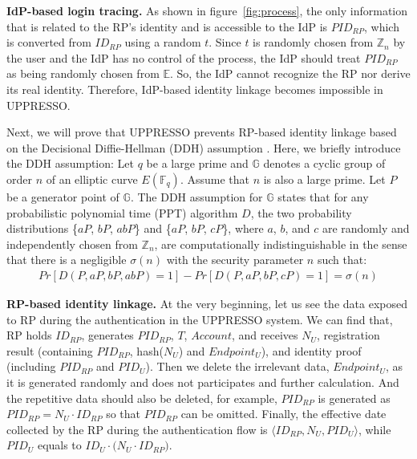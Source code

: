 \noindent\textbf{IdP-based login tracing.}
As shown in figure~\ref{fig:process}, the only information that is related to the RP's identity and is accessible to the IdP is $PID_{RP}$,
 which is converted from $ID_{RP}$ using a random $t$.
Since $t$ is randomly chosen from $\mathbb{Z}_n$ by the user
 and the IdP has no control of the process,
 the IdP should treat $PID_{RP}$ as being randomly chosen from $\mathbb{E}$.
So, the IdP cannot recognize the RP nor derive its real identity. Therefore, IdP-based identity linkage becomes impossible in UPPRESSO.

Next, we will prove that UPPRESSO prevents RP-based identity linkage based on the Decisional Diffie-Hellman (DDH) assumption \cite{GoldwasserK16}. Here, we briefly introduce the DDH assumption:
Let $q$ be a large prime and $\mathbb{G}$ denotes a cyclic group of order $n$ of an elliptic curve $E(\mathbb{F}_q)$.
Assume that $n$ is also a large prime. Let $P$ be a generator point of $\mathbb{G}$. The DDH assumption for $\mathbb{G}$ states that for any probabilistic polynomial time (PPT) algorithm $D$, the two probability distributions \{$aP$, $bP$, $abP$\} and \{$aP$, $bP$, $cP$\}, where $a$, $b$, and $c$ are randomly and independently chosen from $\mathbb{Z}_n$, are computationally indistinguishable in the sense that there is a negligible $\sigma(n)$ with the security parameter $n$ such that:
\vspace{-\topsep}
\begin{multline*}
Pr[D(P, aP, bP, abP)=1]-Pr[D(P, aP, bP, cP)=1]=\sigma(n)
\end{multline*}
\vspace{-\topsep}

\vspace{-2mm}
\noindent\textbf{RP-based identity linkage.}
At the very beginning, let us see the data exposed to RP during the authentication in the UPPRESSO system.
We can find that, RP holds $ID_{RP}$,  generates $PID_{RP}$, $T$, $Account$, and receives $N_U$, registration result (containing $PID_{RP}$, hash($N_U$) and $Endpoint_U$), and identity proof (including $PID_{RP}$ and $PID_U$). Then we delete the irrelevant data, $Endpoint_U$, as it is generated randomly and does not participates and further calculation. And the repetitive data should also be deleted, for example, $PID_{RP}$ is generated as $PID_{RP}=N_U \cdot {ID_{RP}}$ so that $PID_{RP}$ can be omitted. Finally, the effective date collected by the RP during the authentication flow is $\langle ID_{RP}, N_U, PID_U\rangle$, while $PID_U$ equals to $ID_U \cdot{(N_U \cdot {ID_{RP})}}$.


